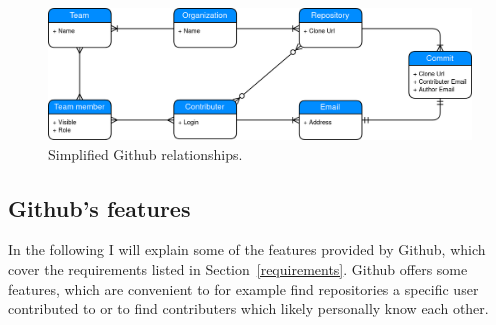 \begin{figure}[H]
\includegraphics[scale=0.27]{./graphs/github-data-structure}
\centering
\caption{Simplified Github relationships.}\label{fig:github-relationship}
\end{figure}

\subsection{Github's features}
In the following I will explain some of the features provided by Github, which cover the requirements listed in Section~\ref{requirements}.
Github offers some features, which are convenient to for example find repositories a specific user contributed to or to find contributers which likely personally know each other.

